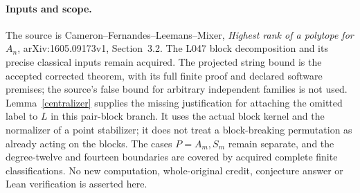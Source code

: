 \documentclass[11pt,a4paper]{article}
\begin{document}
\paragraph{Inputs and scope.}
The source is Cameron--Fernandes--Leemans--Mixer,
\emph{Highest rank of a polytope for $A_n$},
arXiv:1605.09173v1, Section~3.2. The L047 block decomposition
and its precise classical inputs remain acquired. The projected
string bound is the accepted corrected theorem, with its full
finite proof and declared software premises; the source's false
bound for arbitrary independent families is not used.
Lemma~\ref{centralizer} supplies the missing justification for
attaching the omitted label to $L$ in this pair-block branch.
It uses the actual block kernel and the normalizer of a point
stabilizer; it does not treat a block-breaking permutation as
already acting on the blocks. The cases $P=A_m,S_m$ remain
separate, and the degree-twelve and fourteen boundaries are
covered by acquired complete finite classifications. No new
computation, whole-original credit, conjecture answer or Lean
verification is asserted here.
\end{document}
